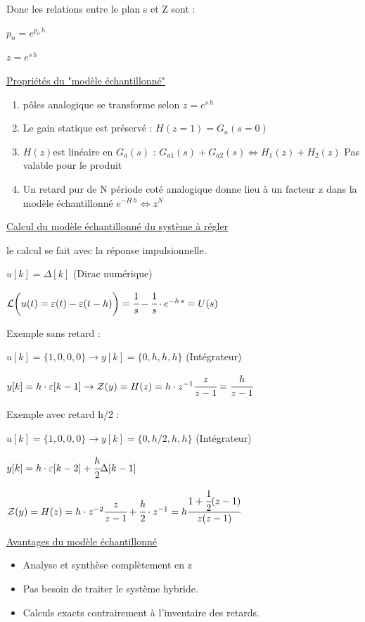 Donc les relations entre le plan s et Z sont : 

$p_n = e^{p_a\,h}$

$z = e^{s \, h}$

\underline{Propriétés du "modèle échantillonné"}
\begin{enumerate}
    \item pôles analogique se transforme selon $z = e^{s \, h}$
    \item Le gain  statique est préservé : $H(z = 1) = G_a(s = 0)$
    \item $H(z) $est linéaire en $G_a(s)$ : $G_{a1}(s) + G_{a2 }(s) \Leftrightarrow H_1(z) + H_2(z)$ Pas valable pour le produit 
    \item Un retard pur de N période coté analogique donne lieu à un facteur z dans la modèle échantillonné $e^{-H\,h}\Leftrightarrow z^N$
\end{enumerate}

\underline{Calcul du modèle échantillonné du système à régler}

le calcul se fait avec la réponse impulsionnelle.

$u[k] = \Delta[k]$ (Dirac numérique)

$\mathcal{L}\bigg(u(t) = \varepsilon(t) - \varepsilon(t-h)\bigg) = \cfrac{1}{s} - \cfrac{1}{s} \cdot e^{-h\,s} = U(s) $

Exemple sans retard : 

$u[k] = \{1,0,0,0\} \rightarrow y[k] = \{0,h,h,h\}$ (Intégrateur)

$y[k] =h \cdot \varepsilon[k-1] \rightarrow \mathcal{Z}(y) = H(z) = h \cdot z^{-1} \cfrac{z}{z-1} = \cfrac{h}{z-1} $

Exemple avec retard h/2 : 


$u[k] = \{1,0,0,0\} \rightarrow y[k] = \{0,h/2,h,h\}$ (Intégrateur)

$y[k] =h \cdot \varepsilon[k-2] + \cfrac{h}{2} \Delta[k-1]$

$\mathcal{Z}(y) = H(z) = h \cdot z^{-2} \cfrac{z}{z-1} + \cfrac{h}{2} \cdot z^{-1} = h\cfrac{1+\cfrac{1}{2}(z-1)}{z(z-1)} $


\underline{Avantages du modèle échantillonné}

\begin{itemize}
    \item Analyse et synthèse complètement en z
    \item Pas besoin de traiter le système hybride.
    \item Calculs exacts contrairement à l'inventaire des retards.
\end{itemize}

